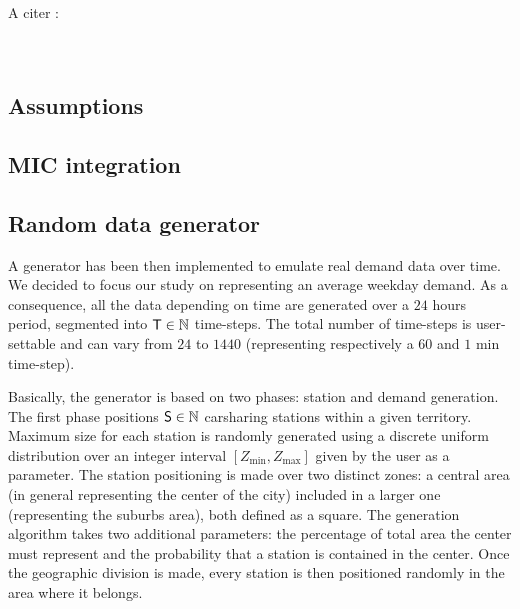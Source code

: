 \begin{bibunit}[ieeetr]
A citer :\\
\cite{modele_deplacement_dreif_2008}\\
\cite{danielis_potential_2015}\\


\subsection{Assumptions}




\subsection{MIC integration}




\subsection{Random data generator}
A generator has been then implemented to emulate real demand data over time. We decided to focus our study on representing an average weekday demand. As a consequence, all the data depending on time are generated over a $24$ hours period, segmented into $\mathsf{T} \in \mathbb{N}$ time-steps. The total number of time-steps is user-settable and can vary from $24$ to $1440$ (representing respectively a $60$ and $1$ min time-step).

\medskip
Basically, the generator is based on two phases: station and demand generation. The first phase positions $\mathsf{S} \in \mathbb{N}$ carsharing stations within a given territory. Maximum size for each station is randomly generated using a discrete uniform distribution over an integer interval $[Z_{\min}, Z_{\max}]$ given by the user as a parameter.
The station positioning is made over two distinct zones: a central area (in general representing the center of the city) included in a larger one (representing the suburbs area), both defined as a square. The generation algorithm takes two additional parameters: the percentage of total area the center must represent and the probability that a station is contained in the center. Once the geographic division is made, every station is then positioned randomly in the area where it belongs. 



\end{bibunit}
